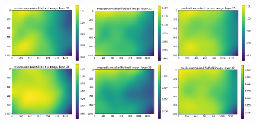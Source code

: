 \documentclass[letterpaper,11pt]{article}
\begin{document}
\begin{figure}[!ht]
\includegraphics[width=0.32\textwidth]{images/results/masked_over_unmasked_flatfield_image_layers/masked_over_unmasked_flatfield_image_layer_19}
\includegraphics[width=0.32\textwidth]{images/results/masked_over_unmasked_flatfield_image_layers/masked_over_unmasked_flatfield_image_layer_22}
\includegraphics[width=0.32\textwidth]{images/results/masked_over_unmasked_flatfield_image_layers/masked_over_unmasked_flatfield_image_layer_25}
\includegraphics[width=0.32\textwidth]{images/results/masked_over_unmasked_flatfield_image_layers/masked_over_unmasked_flatfield_image_layer_26}
\includegraphics[width=0.32\textwidth]{images/results/masked_over_unmasked_flatfield_image_layers/masked_over_unmasked_flatfield_image_layer_29}
\includegraphics[width=0.32\textwidth]{images/results/masked_over_unmasked_flatfield_image_layers/masked_over_unmasked_flatfield_image_layer_32}

\end{figure}
\end{document}
